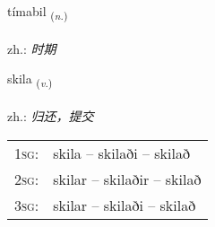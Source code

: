\documentclass[frontgrid, backgrid]{flacards}\usepackage[]{graphicx}\usepackage[]{xcolor}
\begin{document}
\renewcommand{\flhead}{\vskip5pt \fboxsep=0pt {\small\bfseries\footnotesize Nafnorð | 名词}}
\renewcommand{\fcfoot}{\vskip5pt \fboxsep=0pt \hspace{2pt}{\small\bfseries\footnotesize 1K}}

\renewcommand{\blhead}{\vskip5pt {\small\bfseries\footnotesize Nafnorð | 名词 }}
\renewcommand{\bcfoot}{\vskip5pt \hspace{2pt}{\small\bfseries\footnotesize 1K}}


{tímabil \small{\textsubscript{(\textit{n.})}} \\[1ex] %
\textphonetic{[tʰiːmapɪl]} \\
zh.: \emph{时期} \\  [2ex]
\renewcommand*{\arraystretch}{0.8}
}

\renewcommand{\flhead}{\vskip5pt \fboxsep=0pt {\small\bfseries\footnotesize Sagnorð | 动词}}
\renewcommand{\fcfoot}{\vskip5pt \fboxsep=0pt \hspace{2pt}{\small\bfseries\footnotesize 1K}}

\renewcommand{\blhead}{\vskip5pt {\small\bfseries\footnotesize Sagnorð | 动词 }}
\renewcommand{\bcfoot}{\vskip5pt \hspace{2pt}{\small\bfseries\footnotesize 1K}}


{skila \small{\textsubscript{(\textit{v.})}} \\[1ex] %
\textphonetic{[scɪːla]} \\
zh.: \emph{归还，提交} \\  [2ex]
\renewcommand*{\arraystretch}{0.8}
\begin{tabular}{p{1cm}l}
\textsc{1sg}: & skila -- skilaði -- skilað \\ 
\textsc{2sg}: & skilar -- skilaðir -- skilað \\ 
\textsc{3sg}: & skilar -- skilaði -- skilað \\ 
\end{tabular}
}
\end{document}
